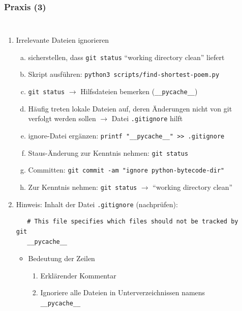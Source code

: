 \documentclass{beamer}
\begin{document}
\begin{frame}[fragile,label=uebung30]
\frametitle{Praxis (3)}
\begin{columns}
\begin{enumerate}
 \setcounter{enumi}{\value{taskcounter}}

  \item Irrelevante Dateien ignorieren
  \begin{enumerate}[a)]
   \item sicherstellen, dass \verb|git status| "`working directory clean"' liefert
   \item Skript ausführen: \verb|python3 scripts/find-shortest-poem.py|
   \item \verb|git status| $\rightarrow$ Hilfsdateien bemerken (\verb|__pycache__|)
   \item[] {\scriptsize Häufig treten lokale Dateien auf, deren Änderungen nicht von git verfolgt werden sollen
   $\rightarrow$ Datei \verb|.gitignore| hilft}
   \item ignore-Datei ergänzen: \verb|printf "__pycache__" >> .gitignore|
   \item Staus-Änderung zur Kenntnis nehmen: \verb|git status|
   \item Committen: \verb|git commit -am "ignore python-bytecode-dir"|
\smallskip
   \item Zur Kenntnis nehmen: \verb|git status| $\rightarrow$ "`working directory clean"'
  \end{enumerate}
  \item[] Hinweis: Inhalt der Datei \verb|.gitignore| (nachprüfen):
  {\scriptsize
  \begin{verbatim}
   # This file specifies which files should not be tracked by git
   __pycache__
  \end{verbatim}
  }
  \vspace{-3mm}
  \begin{itemize}
  \item Bedeutung der Zeilen
  \begin{enumerate}
   \item Erklärender Kommentar
   \item Ignoriere alle Dateien in Unterverzeichnissen namens \verb|__pycache__|
  \end{enumerate}

  \end{itemize}
 \setcounter{taskcounter}{\value{enumi}}
\end{enumerate}
  ~
\end{columns}
\end{frame}
\end{document}
